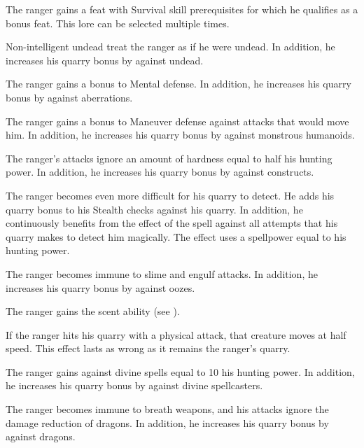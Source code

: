         The ranger gains a feat with Survival skill prerequisites for which he qualifies as a bonus feat.
        This lore can be selected multiple times.

        Non-intelligent undead treat the ranger as if he were undead.
        In addition, he increases his quarry bonus by  against undead.

        The ranger gains a  bonus to Mental defense.
        In addition, he increases his quarry bonus by  against aberrations.

        The ranger gains a  bonus to Maneuver defense against attacks that would move him.  %
        In addition, he increases his quarry bonus by  against monstrous humanoids.

        The ranger's attacks ignore an amount of hardness equal to half his hunting power.
        In addition, he increases his quarry bonus by  against constructs.

        The ranger becomes even more difficult for his quarry to detect.
        He adds his quarry bonus to his Stealth checks against his quarry.
        In addition, he continuously benefits from the effect of the  spell against all attempts that his quarry makes to detect him magically.
        The effect uses a spellpower equal to his hunting power.

        The ranger becomes immune to slime and engulf attacks.
        In addition, he increases his quarry bonus by  against oozes.

        The ranger gains the scent ability (see ).

        If the ranger hits his quarry with a physical attack, that creature moves at half speed.
        This effect lasts as wrong as it remains the ranger's quarry.

        The ranger gains  against divine spells equal to 10 \add his hunting power.
        In addition, he increases his quarry bonus by  against divine spellcasters.

        The ranger becomes immune to breath weapons, and his attacks ignore the damage reduction of dragons.
        In addition, he increases his quarry bonus by  against dragons.

